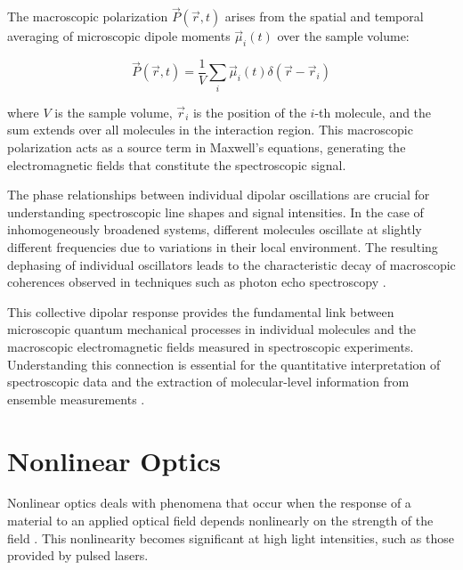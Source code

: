 \noindent The macroscopic polarization $\vec{P}(\vec{r}, t)$ arises from the spatial and temporal averaging of microscopic dipole moments $\vec{\mu}_i(t)$ over the sample volume:

\begin{equation}
	\vec{P}(\vec{r}, t) = \frac{1}{V} \sum_{i} \vec{\mu}_i(t) \delta(\vec{r} - \vec{r}_i)
	\label{eq:macroscopic_polarization}
\end{equation}

\noindent where $V$ is the sample volume, $\vec{r}_i$ is the position of the $i$-th molecule, and the sum extends over all molecules in the interaction region. This macroscopic polarization acts as a source term in Maxwell's equations, generating the electromagnetic fields that constitute the spectroscopic signal.

\noindent The phase relationships between individual dipolar oscillations are crucial for understanding spectroscopic line shapes and signal intensities. In the case of inhomogeneously broadened systems, different molecules oscillate at slightly different frequencies due to variations in their local environment. The resulting dephasing of individual oscillators leads to the characteristic decay of macroscopic coherences observed in techniques such as photon echo spectroscopy \cite{mukamel1995principlesnonlinearoptical}.

\noindent This collective dipolar response provides the fundamental link between microscopic quantum mechanical processes in individual molecules and the macroscopic electromagnetic fields measured in spectroscopic experiments. Understanding this connection is essential for the quantitative interpretation of spectroscopic data and the extraction of molecular-level information from ensemble measurements \cite{feynman1965feynmanlecturesphysics}.


\section{Nonlinear Optics}
\label{sec:nonlinear_optics}

\noindent Nonlinear optics deals with phenomena that occur when the response of a material to an applied optical field depends nonlinearly on the strength of the field \cite{boyd2008contents}. This nonlinearity becomes significant at high light intensities, such as those provided by pulsed lasers.

